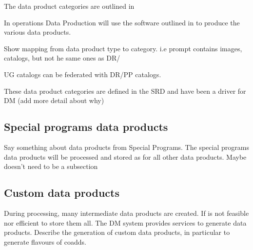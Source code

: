 The data product categories are outlined in \citet{LPM-231}

In operations Data Production will use the  software outlined in  to produce the various data products.

Show mapping from data product type to category. i.e prompt contains images, catalogs, but not he same ones as DR/

UG catalogs can be federated with DR/PP catalogs.

These data product categories are defined in the SRD \citep{LPM-17} and have been a driver for DM
(add more detail about why)

\subsection{Special programs data products}
Say something about data products from Special Programs.
The special programs data products will be processed and stored as for all other data products.
Maybe doesn't need to be a subsection

\subsection{Custom data products}
During processing, many intermediate data products are created. If is not feasible nor efficient to store them all.
The DM system provides services to generate data products.
Describe the generation of custom data products, in particular to generate  flavours of coadds.




